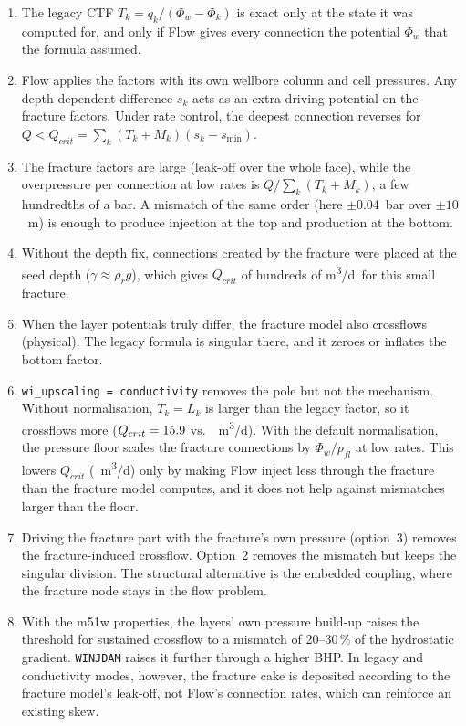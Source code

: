 \documentclass[11pt,a4paper]{article}
\newcommand{\Phiw}{\Phi_w}
\newcommand{\rated}{\si{m^3/d}}
\begin{document}
\begin{enumerate}
\item The legacy CTF $T_k=q_k/(\Phiw-\Phi_k)$ is exact only at the state it was computed for,
  and only if Flow gives every connection the potential $\Phiw$ that the formula assumed.
\item Flow applies the factors with its own wellbore column and cell pressures.  Any
  depth-dependent difference $s_k$ acts as an extra driving potential on the fracture factors.
  Under rate control, the deepest connection reverses for $Q<Q_{crit}=\sum_k(T_k+M_k)(s_k-s_{\min})$.
\item The fracture factors are large (leak-off over the whole face), while the overpressure per
  connection at low rates is $Q/\sum_k(T_k+M_k)$, a few hundredths of a bar.  A mismatch of the
  same order (here $\pm0.04$~bar over $\pm10$~m) is enough to produce injection at the top and
  production at the bottom.
\item Without the depth fix, connections created by the fracture were placed at the seed depth
  ($\gamma\approx\rho_r g$), which gives $Q_{crit}$ of hundreds of \rated\ for this small
  fracture.
\item When the layer potentials truly differ, the fracture model also crossflows (physical).
  The legacy formula is singular there, and it zeroes or inflates the bottom factor.
\item \texttt{wi\_upscaling = conductivity} removes the pole but not the mechanism.  Without
  normalisation, $T_k=L_k$ is larger than the legacy factor, so it crossflows more
  ($Q_{crit}=15.9$ vs.\ \Qcrit~\rated).  With the default normalisation, the pressure floor
  scales the fracture connections by $\Phiw/p_{fl}$ at low rates.  This lowers $Q_{crit}$
  (\QcritCD~\rated) only by making Flow inject less through the fracture than the fracture model
  computes, and it does not help against mismatches larger than the floor.
\item Driving the fracture part with the fracture's own pressure (option~3) removes the
  fracture-induced crossflow.  Option~2 removes the mismatch but keeps the singular division.
  The structural alternative is the embedded coupling, where the fracture node stays in the
  flow problem.
\item With the m51w properties, the layers' own pressure build-up raises the threshold for
  sustained crossflow to a mismatch of 20--30\,\% of the hydrostatic gradient.
  \texttt{WINJDAM} raises it further through a higher BHP.  In legacy and conductivity modes,
  however, the fracture cake is deposited according to the fracture model's leak-off, not
  Flow's connection rates, which can reinforce an existing skew.
\end{enumerate}
\end{document}

